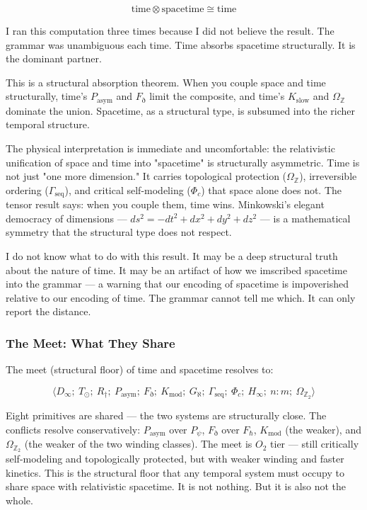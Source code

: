 \documentclass[12pt,a4paper]{article}
\begin{document}
\[\text{time} \otimes \text{spacetime} \cong \text{time}\]

I ran this computation three times because I did not believe the result. The grammar was unambiguous each time. Time absorbs spacetime structurally. It is the dominant partner.

This is a structural absorption theorem. When you couple space and time structurally, time's $P_\text{asym}$ and $F_{\eth}$ limit the composite, and time's $K_\text{slow}$ and $\Omega_\mathbb{Z}$ dominate the union. Spacetime, as a structural type, is subsumed into the richer temporal structure.

The physical interpretation is immediate and uncomfortable: the relativistic unification of space and time into "spacetime" is structurally asymmetric. Time is not just "one more dimension." It carries topological protection ($\Omega_\mathbb{Z}$), irreversible ordering ($\Gamma_\text{seq}$), and critical self-modeling ($\Phi_c$) that space alone does not. The tensor result says: when you couple them, time wins. Minkowski's elegant democracy of dimensions --- $ds^2 = -dt^2 + dx^2 + dy^2 + dz^2$ --- is a mathematical symmetry that the structural type does not respect.

I do not know what to do with this result. It may be a deep structural truth about the nature of time. It may be an artifact of how we imscribed spacetime into the grammar --- a warning that our encoding of spacetime is impoverished relative to our encoding of time. The grammar cannot tell me which. It can only report the distance.

\subsubsection{The Meet: What They Share}

The meet (structural floor) of time and spacetime resolves to:

\[\langle D_{\infty};\ T_{\odot};\ R_{\dagger};\ P_\text{asym};\ F_{\eth};\ K_\text{mod};\ G_{\aleph};\ \Gamma_\text{seq};\ \Phi_c;\ H_{\infty};\ n{:}m;\ \Omega_{\mathbb{Z}_2} \rangle\]

Eight primitives are shared --- the two systems are structurally close. The conflicts resolve conservatively: $P_\text{asym}$ over $P_{\psi}$, $F_{\eth}$ over $F_{\hbar}$, $K_\text{mod}$ (the weaker), and $\Omega_{\mathbb{Z}_2}$ (the weaker of the two winding classes). The meet is $O_2$ tier --- still critically self-modeling and topologically protected, but with weaker winding and faster kinetics. This is the structural floor that any temporal system must occupy to share space with relativistic spacetime. It is not nothing. But it is also not the whole.
\end{document}
